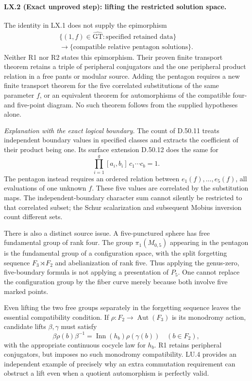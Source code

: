 \paragraph{LX.2 (Exact unproved step): lifting the restricted solution space.}
The identity in LX.1 does not supply the epimorphism
\[
\begin{gathered}
 \{(1,f)\in\widehat{\mathrm{GT}}:\text{specified retained data}\}\\
 \longrightarrow
 \{\text{compatible relative pentagon solutions}\}.
\end{gathered}
\]
Neither R1 nor R2 states this epimorphism. Their proven
finite transport theorem retains a triple of peripheral
conjugators and the one peripheral product relation in a free
pants or modular source. Adding the pentagon requires a new
finite transport theorem for the five correlated substitutions
of the same parameter $f$, or an equivalent theorem for
automorphisms of the compatible four- and five-point diagram.
No such theorem follows from the supplied hypotheses alone.

\emph{Explanation with the exact logical boundary.}
The count of D.50.11 treats independent boundary values in
specified classes and extracts the coefficient of their product
being one. Its surface extension D.50.12 does the same for
\[
 \prod_{i=1}^g[a_i,b_i]\,c_1\cdots c_b=1.
\]
The pentagon instead requires an ordered relation between
$e_1(f),\ldots,e_5(f)$, all evaluations of one unknown $f$.
These five values are correlated by the substitution maps.
The independent-boundary character sum cannot silently be
restricted to that correlated subset; the Schur scalarization
and subsequent Mobius inversion count different sets.

There is also a distinct source issue. A five-punctured sphere
has free fundamental group of rank four. The group
$\pi_1(M_{0,5})$ appearing in the pentagon is the fundamental
group of a configuration space, with the split forgetting
sequence $F_3\rtimes F_2$ and abelianization of rank five.
Thus applying the genus-zero, five-boundary formula is not
applying a presentation of $P_5$. One cannot replace the
configuration group by the fiber curve merely because both
involve five marked points.

Even lifting the two free groups separately in the forgetting
sequence leaves the essential compatibility condition. If
$\rho:F_2\to\operatorname{Aut}(F_3)$ is its monodromy action,
candidate lifts $\beta,\gamma$ must satisfy
\[
 \beta\rho(b)\beta^{-1}
   =\operatorname{Inn}(h_b)\rho(\gamma(b))
       \quad(b\in F_2),
\]
with the appropriate continuous cocycle law for $h_b$.
R1 retains peripheral conjugators, but imposes no such
monodromy compatibility. LU.4 provides an independent example
of precisely why an extra commutation requirement can obstruct
a lift even when a quotient automorphism is perfectly valid.

